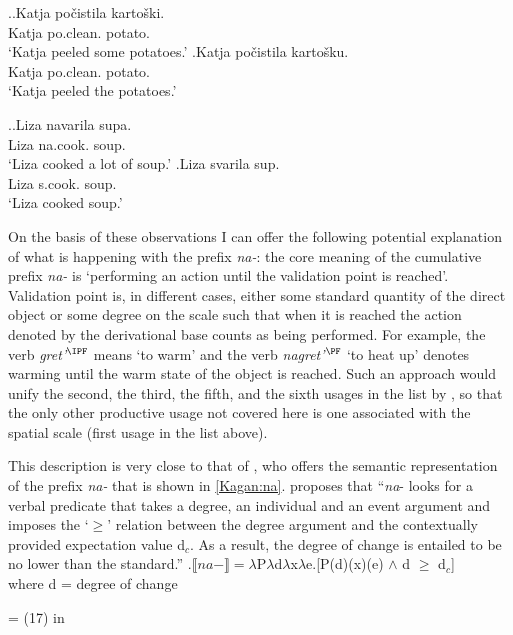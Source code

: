 \ex.\label{ex:na:po}\ag.\label{ex:na:po:gen}Katja po\v{c}istila karto\v{s}ki.\\
Katja po.clean. potato.\\
\vspace{0.5em}
`Katja peeled some potatoes.'
\bg.\label{ex:na:po:acc}Katja po\v{c}istila karto\v{s}ku.\\
Katja po.clean. potato.\\
\vspace{0.5em}
`Katja peeled the potatoes.'

\ex.\ag.\label{ex:navarit}Liza navarila supa.\\
Liza na.cook. soup.\\
\vspace{0.5em}
`Liza cooked a lot of soup.'
\bg.\label{ex:svarit}Liza svarila sup.\\
Liza s.cook. soup.\\
\vspace{0.5em}
`Liza cooked soup.'

On the basis of these observations I can offer the following potential explanation of what is happening with the prefix \textit{na-}: the core meaning of the cumulative prefix \textit{na-} is `performing an action until the validation point is reached'. Validation point is, in different cases, either some standard quantity of the direct object or some degree on the scale such that when it is reached the action denoted by the derivational base counts as being performed. For example, the verb \textit{gret'$^{\IPF}$} means `to warm' and the verb \textit{nagret'$^{\PF}$} `to heat up' denotes warming until the warm state of the object is reached. Such an approach would unify the second, the third, the fifth, and the sixth usages in the list by \citet{Shvedova:82}, so that the only other productive usage not covered here is one associated with the spatial scale (first usage in the list above). 

This description is very close to that of \citet{Kagan:book}, who offers the semantic representation of the prefix \textit{na-} that is shown in \ref{Kagan:na}. \citet[55]{Kagan:book} proposes that ``\textit{na}- looks for a verbal predicate that takes a degree, an individual and an event argument and imposes the `$\geqslant$' relation between the degree argument and the contextually provided expectation value d$_c$. As a result, the degree of change is entailed to be no lower than the standard.''
\ex.\label{Kagan:na}$\llbracket na- \rrbracket = \lambda$P$\lambda$d$\lambda$x$\lambda$e.[P(d)(x)(e) $\wedge$ d $\geqslant$ d$_c$]\\
where d = degree of change \citep{KennedyLevin:02}
\begin{flushright}
\vspace{-0.5em}
= (17) in \citealt[55]{Kagan:book}
\end{flushright}

